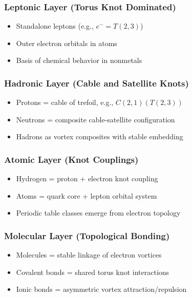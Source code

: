 \subsubsection*{Leptonic Layer (Torus Knot Dominated)}
\begin{itemize}
    \item Standalone leptons (e.g., \( e^- = T(2,3) \))
    \item Outer electron orbitals in atoms
    \item Basis of chemical behavior in nonmetals
\end{itemize}

\subsubsection*{Hadronic Layer (Cable and Satellite Knots)}
\begin{itemize}
    \item Protons = cable of trefoil, e.g., \( C(2,1)(T(2,3)) \)
    \item Neutrons = composite cable-satellite configuration
    \item Hadrons as vortex composites with stable embedding
\end{itemize}

\subsubsection*{Atomic Layer (Knot Couplings)}
\begin{itemize}
    \item Hydrogen = proton + electron knot coupling
    \item Atoms = quark core + lepton orbital system
    \item Periodic table classes emerge from electron topology
\end{itemize}

\subsubsection*{Molecular Layer (Topological Bonding)}
\begin{itemize}
    \item Molecules = stable linkage of electron vortices
    \item Covalent bonds = shared torus knot interactions
    \item Ionic bonds = asymmetric vortex attraction/repulsion
\end{itemize}

